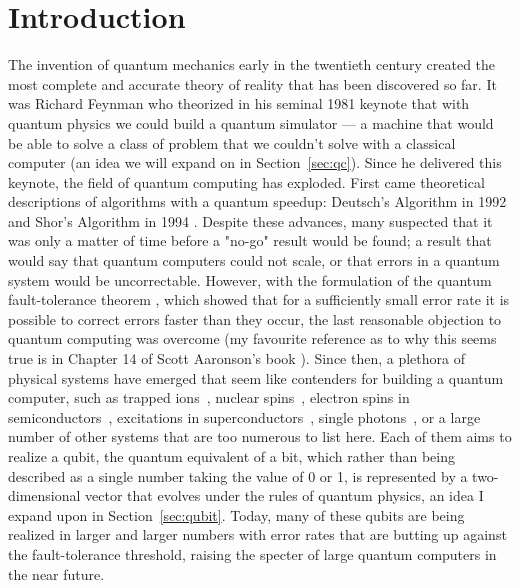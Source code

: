 \chapter{Introduction}

The invention of quantum mechanics early in the twentieth century created the most complete and accurate
theory of reality that has been discovered so far. It was Richard Feynman who theorized in his
seminal 1981 keynote \cite{Feynman1982} that with quantum physics we could build a quantum simulator ---
a machine that would be able to solve a class of problem that we couldn't solve with a
classical computer (an idea we will expand on in Section~\ref{sec:qc}). Since he delivered this keynote, the
field of quantum computing has exploded. First came theoretical descriptions of algorithms
with a quantum speedup: Deutsch's Algorithm in 1992 \cite{Deutsch} and Shor's Algorithm in 1994 \cite{Shor}.
Despite these advances, many suspected that it was only a matter of time before a "no-go" result would
be found; a result that would say that quantum computers could not scale, or that errors in a quantum system would be uncorrectable.
However, with the formulation of the quantum fault-tolerance theorem \cite{1996quant.ph.11025A,doi:10.1098/rspa.1998.0167}, which
showed that for a sufficiently small error rate it is possible to correct errors faster than they occur, the last
reasonable objection to quantum computing was overcome (my favourite reference as to why this seems true
is in Chapter 14 of Scott Aaronson's book \cite{Aaronson:skepticism}). Since then, a plethora of physical
systems have emerged that seem like contenders for building a quantum computer, such as trapped
ions~\cite{doi:10.1063/1.5088164}, nuclear spins~\cite{acs.nanolett.8b00006}, electron spins in
semiconductors~\cite{RevModPhys.79.1217}, excitations in superconductors~\cite{Wendin_2017},
single photons~\cite{OBrien1567}, or a large number of other systems that are too numerous to list here.
Each of them aims to realize a qubit, the quantum equivalent of a bit, which rather than being described
as a single number taking the value of 0 or 1, is represented by a two-dimensional vector that evolves under the rules
of quantum physics, an idea I expand upon in Section~\ref{sec:qubit}. Today, many of these qubits are being
realized in larger and larger numbers with error rates that are butting up against the fault-tolerance threshold,
raising the specter of large quantum computers in the near future.

